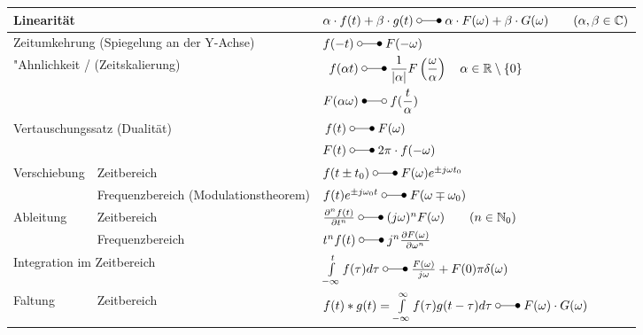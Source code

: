 	     
	\begin{tabular}{|p{3cm}|p{6.5cm}p{9cm}|}
		\hline
			\multicolumn{2}{|l}{Linearität} & $\alpha\cdot f(t) + \beta\cdot g(t) \; \laplace \; \alpha\cdot F(\omega) +\beta\cdot G(\omega) \qquad (\alpha, \beta \in \mathbb{C})$  \\ 
		\hline
			\multicolumn{2}{|l}{Zeitumkehrung (Spiegelung an der Y-Achse)} & $f(-t) \; \laplace \; F(-\omega)$ \\
		\hline
			\multicolumn{2}{|l}{"Ahnlichkeit / (Zeitskalierung)}             &      		$\begin{aligned}f(\alpha t) \; &\laplace \; \frac{1}{|\alpha|}F \left (\frac{\omega}{\alpha} \right)
				     		\quad\alpha \in\mathbb{R}\setminus \{0\}\\
				     		F(\alpha\omega) \; &\Laplace \; f(\frac{t}{\alpha})\end{aligned}$\\ 
		\hline
			\multicolumn{2}{|l}{Vertauschungssatz (Dualität)}              & 
			\begin{math}
				\begin{aligned}
					f(t) \; &\laplace \; F(\omega)\nonumber \\ 
					F(t) \; &\laplace \; 2\pi \cdot f(-\omega)
				\end{aligned}
			\end{math}\\ 
		\hline
		\hline
			\multirow{2}{*}{Verschiebung} & Zeitbereich & $f(t\pm t_0) \; \laplace \; F(\omega)e^{\pm j\omega t_0}$ \\ 
			\cline{2-3} 
			& Frequenzbereich (Modulationstheorem) & $f(t)e^{\pm j\omega_0 t} \; \laplace \; F(\omega\mp\omega_0)$ \\ 
   		\hline
   		\hline
	   		\multirow{2}{*}{Ableitung} & Zeitbereich & $\frac{\partial^n f(t)}{\partial t^n} \; \laplace \; (j\omega)^n F(\omega) \qquad (n \in \mathbb{N}_0)$ \\ 
	   		\cline{2-3} 
	   		& Frequenzbereich &  $t^n f(t) \; \laplace \; j^n \frac{\partial F(\omega)}{\partial \omega^n}$\\ 
   		\hline
   		\hline
   			\multicolumn{2}{|l}{Integration im Zeitbereich} & $\int\limits_{-\infty}^{t}f(\tau)d\tau \; \laplace \;
   			\frac{F(\omega)}{j\omega}+F(0)\pi\delta(\omega)$\\ 
   		\hline
   		\hline
	   		\multirow{2}{*}{Faltung} & Zeitbereich & $f(t) \ast g(t) = \int\limits_{-\infty}^{\infty} f(\tau)g(t-\tau)d\tau \; \laplace \;
	   		F(\omega) \cdot G(\omega)$ \\ 

\end{tabular}
